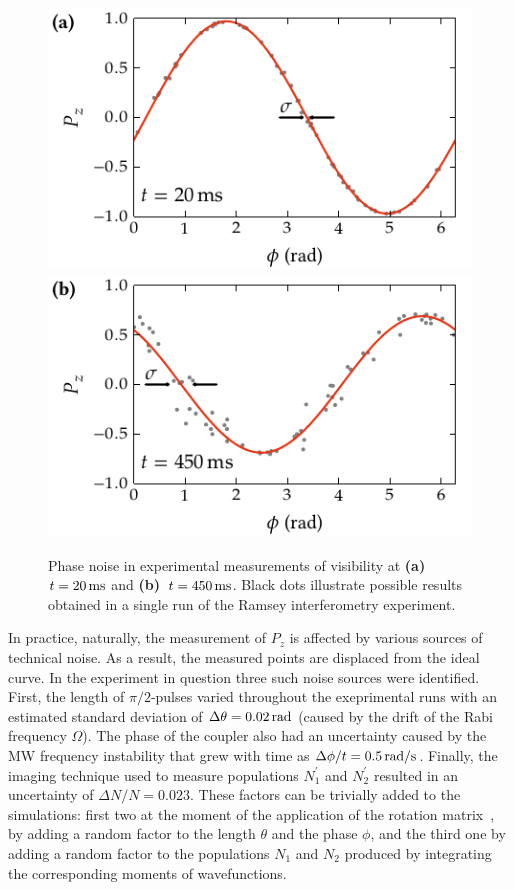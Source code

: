 \begin{figure}
    \centerline{%
    \includegraphics{figures_generated/bec_noise/illustration_noise_20ms.pdf}%
    \includegraphics{figures_generated/bec_noise/illustration_noise_450ms.pdf}}

    \caption[Phase noise in experimental measurements of visibility]{
    Phase noise in experimental measurements of visibility at \textbf{(a)}~$t = 20\mbox{\ensuremath{\,\mathrm{ms}}}$ and \textbf{(b)}~$t = 450\mbox{\ensuremath{\,\mathrm{ms}}}$.
    Black dots illustrate possible results obtained in a single run of the Ramsey interferometry experiment.}%

    \label{fig:bec-noise:phase-noise:illustration}
\end{figure}

In practice, naturally, the measurement of $P_z$ is affected by various sources of technical noise.
As a result, the measured points are displaced from the ideal curve.
In the experiment in question three such noise sources were identified.
First, the length of $\pi/2$-pulses varied throughout the exeprimental runs with an estimated standard deviation of $\Delta \theta = 0.02\mbox{\ensuremath{\,\mathrm{rad}}}$ (caused by the drift of the Rabi frequency $\Omega$).
The phase of the coupler also had an uncertainty caused by the MW frequency instability that grew with time as $\Delta \phi / t = 0.5\mbox{\ensuremath{\,\mathrm{rad/s}}}$.
Finally, the imaging technique used to measure populations $N_1^\prime$ and $N_2^\prime$ resulted in an uncertainty of $\Delta N / N = 0.023$.
These factors can be trivially added to the simulations: first two at the moment of the application of the rotation matrix~, by adding a random factor to the length $\theta$ and the phase $\phi$, and the third one by adding a random factor to the populations $N_1$ and $N_2$ produced by integrating the corresponding moments of wavefunctions.


